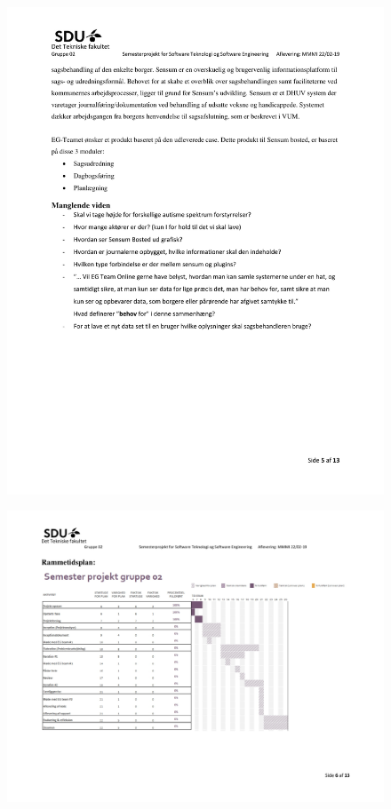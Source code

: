 \begin{figure}[hb]
  \includegraphics[scale = 0.33]{./PNG/Projektforslag/Projektforslag-05.jpg} 
\end{figure}

\begin{landscape}
\begin{figure}[hb]
  \includegraphics[scale = 0.33]{./PNG/Projektforslag/Projektforslag-06.jpg} 
\end{figure}
\end{landscape}


